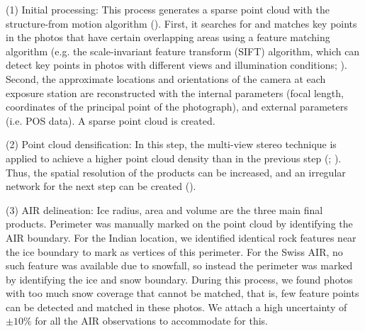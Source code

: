 \documentclass[utf8]{frontiersSCNS} %
\begin{document}
(1) Initial processing: This process generates a sparse point cloud with the structure-from motion algorithm
(\cite{Turner_2012}). First, it searches for and matches key points in the photos that have certain overlapping
areas using a feature matching algorithm (e.g. the scale-invariant feature transform (SIFT) algorithm, which can
detect key points in photos with different views and illumination conditions; \cite{Lowe_2004}). Second, the
approximate locations and orientations of the camera at each exposure station are reconstructed with the internal
parameters (focal length, coordinates of the principal point of the photograph), and external parameters (i.e. POS
data). A sparse point cloud is created.

(2) Point cloud densification: In this step, the multi-view stereo technique is applied to achieve a higher point
cloud density than in the previous step (\cite{Furukawa_2010}; \cite{Molg_2017}). Thus, the spatial resolution of
the products can be increased, and an irregular network for the next step can be created (\cite{Kung_2011}).

(3) AIR delineation: Ice radius, area and volume are the three main final products. Perimeter was manually marked
on the point cloud by identifying the AIR boundary. For the Indian location, we identified identical rock features
near the ice boundary to mark as vertices of this perimeter. For the Swiss AIR, no such feature was available due
to snowfall, so instead the perimeter was marked by identifying the ice and snow boundary. During this process, we found photos with too much snow coverage that cannot be matched, that is, few feature
points can be detected and matched in these photos. We attach a high uncertainty of $\pm 10 \%$ for all the AIR observations to accommodate for this.
\end{document}
